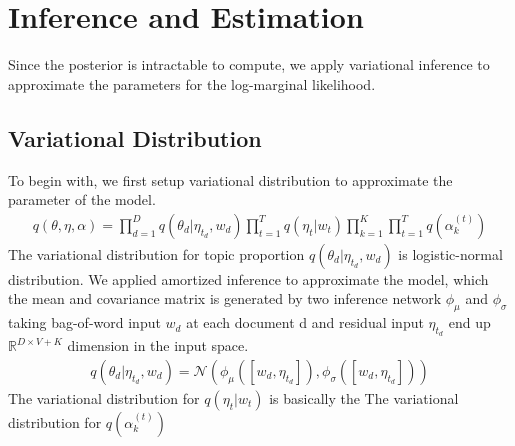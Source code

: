 \section{Inference and Estimation}
Since the posterior is intractable to compute, we apply variational inference to approximate the parameters for the log-marginal likelihood.
\subsection{Variational Distribution}
To begin with, we first setup variational distribution to approximate the parameter of the model. 
\begin{align*}
q(\theta,\eta,\alpha)=\prod_{d=1}^{D}q(\theta_d|\eta_{t_d},w_d)\prod_{t=1}^{T}q(\eta_t|w_t)\prod_{k=1}^{K}\prod_{t=1}^{T}q(\alpha_k^{(t)})
\end{align*}
The variational distribution for topic proportion $ q(\theta_d|\eta_{t_d},w_d) $ is logistic-normal distribution. We applied amortized inference to approximate the model, which the mean and covariance matrix is generated by two inference network $ \phi_{\mu} $ and $ \phi_{\sigma} $ taking bag-of-word input $ w_d $ at each document d and residual input $ \eta_{t_d} $ end up $ \mathbb{R}^{D\times V+K} $ dimension in the input space.
\begin{align*}
q(\theta_d|\eta_{t_d},w_d)=\mathcal{N}(\phi_{\mu}([w_d,\eta_{t_d}]),\phi_{\sigma}([w_{d},\eta_{t_d}]))
\end{align*}
The variational distribution for $ q(\eta_t|w_t) $ is basically the 
The variational distribution for $ q(\alpha_k^{(t)}) $
